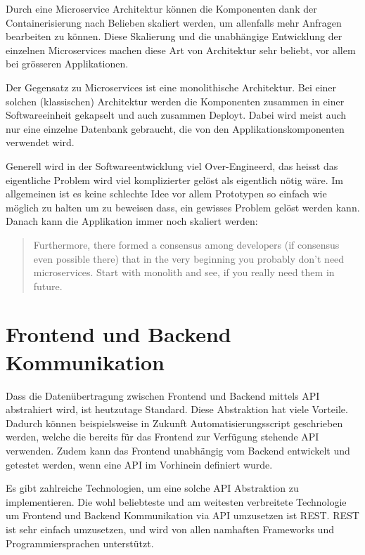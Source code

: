 Durch eine Microservice Architektur können die Komponenten dank der Containerisierung
nach Belieben skaliert werden, um allenfalls mehr Anfragen bearbeiten zu können.
Diese Skalierung und die unabhängige Entwicklung der einzelnen Microservices
machen diese Art von Architektur sehr beliebt, vor allem bei grösseren Applikationen.

Der Gegensatz zu Microservices ist eine monolithische Architektur. Bei einer
solchen (klassischen) Architektur werden die Komponenten zusammen in einer
Softwareeinheit gekapselt und auch zusammen Deployt.
Dabei wird meist auch nur eine einzelne Datenbank gebraucht, die von den
Applikationskomponenten verwendet wird.

Generell wird in der Softwareentwicklung viel Over-Engineerd, das heisst
das eigentliche Problem wird viel komplizierter gelöst als eigentlich
nötig wäre. Im allgemeinen ist es keine schlechte Idee vor allem Prototypen
so einfach wie möglich zu halten um zu beweisen dass, ein gewisses Problem
gelöst werden kann. Danach kann die Applikation immer noch skaliert werden:

\blockquote{
    Furthermore, there formed a consensus among developers (if consensus even possible there) that in
    the very beginning you probably don’t need microservices. Start with monolith and see,
    if you really need them in future. \cite{microservice-shared-db}
}

\section{Frontend und Backend Kommunikation}

Dass die Datenübertragung zwischen Frontend und Backend mittels \ac{API} abstrahiert
wird, ist heutzutage Standard. Diese Abstraktion hat viele Vorteile.
Dadurch können beispielsweise in Zukunft Automatisierungsscript geschrieben werden,
welche die bereits für das Frontend zur Verfügung stehende \ac{API} verwenden.
Zudem kann das Frontend unabhängig vom Backend entwickelt und getestet werden,
wenn eine \ac{API} im Vorhinein definiert wurde.

Es gibt zahlreiche Technologien, um eine solche \ac{API} Abstraktion zu implementieren.
Die wohl beliebteste und am weitesten verbreitete Technologie um Frontend und Backend
Kommunikation via \ac{API} umzusetzen ist \ac{REST}.
\ac{REST} ist sehr einfach umzusetzen, und wird von allen namhaften Frameworks und
Programmiersprachen unterstützt.